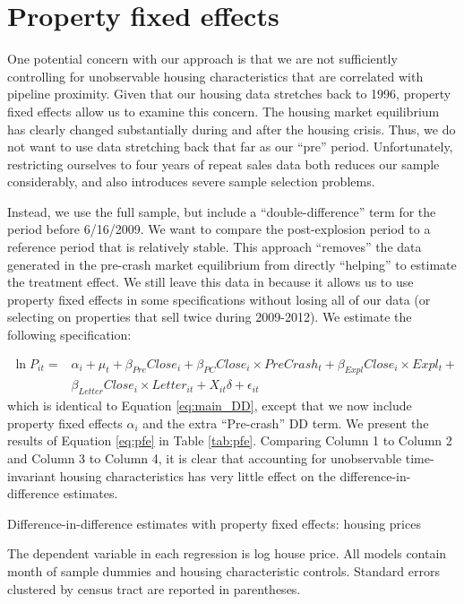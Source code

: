 \documentclass[12pt]{article}
\begin{document}
\section{Property fixed effects \label{sec:Property-fixed-effects} }

\setcounter{figure}{0}  \renewcommand{\thefigure}{B.\arabic{figure}} 
\setcounter{table}{0}  \renewcommand{\thetable}{B.\arabic{table}} 

One potential concern with our approach is that we are not sufficiently controlling for unobservable housing characteristics that are correlated with pipeline proximity. Given that our housing data stretches back to 1996, property fixed effects allow us to examine this concern. The housing market equilibrium has clearly changed substantially during and after the housing crisis. Thus, we do not want to use data stretching back that far as our ``pre'' period. Unfortunately, restricting ourselves to four years of repeat sales data both reduces our sample considerably, and also introduces severe sample selection problems.

Instead, we use the full sample, but include a ``double-difference'' term for the period before 6/16/2009. We want to compare the post-explosion period to a reference period that is relatively stable. This approach ``removes'' the data generated in the pre-crash market equilibrium from directly ``helping'' to estimate the treatment effect. We still leave this data in because it allows us to use property fixed effects in some specifications without losing all of our data (or selecting on properties that sell twice during 2009-2012). We estimate the following specification:

\begin{align}
\ln P_{it}= & \alpha_{i}+\mu_{t}+\beta_{Pre}Close_{i}+\beta_{PC}Close_{i}\times PreCrash_{t}+\beta_{Expl}Close_{i}\times Expl_{t}+\label{eq:pfe}\\
 & \beta_{Letter}Close_{i}\times Letter_{it}+X_{it}\delta+\epsilon_{it}\nonumber 
\end{align}
which is identical to Equation \ref{eq:main_DD}, except that we now include property fixed effects $\alpha_{i}$ and the extra ``Pre-crash'' DD term. We present the results of Equation \ref{eq:pfe} in Table \ref{tab:pfe}. Comparing Column 1 to Column 2 and Column 3 to Column 4, it is clear that accounting for unobservable time-invariant housing characteristics has very little effect on the difference-in-difference estimates.

\begin{table}[H]
\caption{Difference-in-difference estimates with property fixed effects: housing
prices\label{tab:pfe}}

\footnotesize
\begin{centering}

\par\end{centering}
\scriptsize

The dependent variable in each regression is log house price. All models contain month of sample dummies and housing characteristic controls. Standard errors clustered by census tract are reported in parentheses. 
\end{table}
\end{document}
